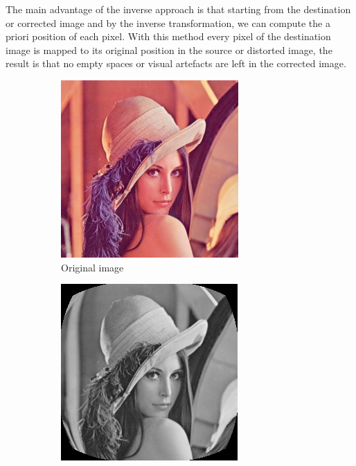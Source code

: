 \documentclass[12pt]{article}
\begin{document}
%
The main advantage of the inverse approach is that starting from the destination or corrected image and by the inverse transformation, we can compute the a priori position of each pixel. With this method every pixel of the destination image is mapped to its original position in the source or distorted image, the result is that no empty spaces or visual artefacts are left in the corrected image.
%
\begin{figure}[h!]
	\centering
	\begin{subfigure}{0.30\linewidth}
		\centering
		\includegraphics[width=\linewidth]{./figures/lena.jpg}
		\caption{Original image}
		\label{lena02}
	\end{subfigure}\hfill
	\begin{subfigure}{0.30\linewidth}
		\centering
		\includegraphics[width=\linewidth]{./figures/lena11.jpg}

\end{subfigure}
\end{figure}
\end{document}
